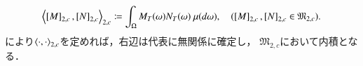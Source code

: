 	\begin{screen}
		\begin{lem}
			\begin{align}
				\inprod<\equiv{M}{2,c},\equiv{N}{2,c}>_{2,c} \coloneqq \int_{\Omega} M_T(\omega)N_T(\omega)\ \mu(d\omega), \quad (\equiv{M}{2,c},\equiv{N}{2,c} \in \mathfrak{M}_{2,c}).
				\label{eq:M_2c_inner_product}
			\end{align}
			により$\inprod<\cdot,\cdot>_{2,c}$を定めれば，右辺は代表に無関係に確定し，
			$\mathfrak{M}_{2,c}$において内積となる．
			\label{lem:M_2c_hilbert_inner_product}
		\end{lem}
	\end{screen}
			
	\footnotetext{
		
	}
			
